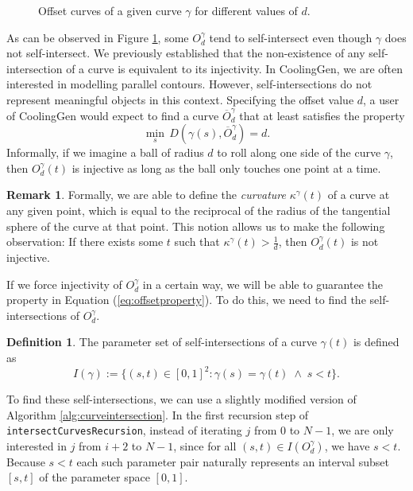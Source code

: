 \documentclass[a4paper, 11pt]{report}
\theoremstyle{definition}
\newtheorem{definition}{Definition}[section]
\newtheorem*{remark}{Remark}
\renewcommand{\emph}[1]{\textit{#1}}
\begin{document}
	\begin{figure}[H]
		\centering
		
		\caption{Offset curves of a given curve $\gamma$ for different values of $d$.}
		\label{fig:offsetcurveexample}
	\end{figure}

	As can be observed in Figure \ref{fig:offsetcurveexample}, some $O^\gamma_d$ tend to self-intersect even though $\gamma$ does not self-intersect. We previously established that the non-existence of any self-intersection of a curve is equivalent to its injectivity. In CoolingGen, we are often interested in modelling parallel contours. However, self-intersections do not represent meaningful objects in this context. Specifying the offset value $d$, a user of CoolingGen would expect to find a curve $\overline{O}^\gamma_d$ that at least satisfies the property
	\begin{equation}\label{eq:offsetproperty}
		\min_s \, D(\gamma(s), \overline{O}^\gamma_d) = d.
	\end{equation}
	Informally, if we imagine a ball of radius $d$ to roll along one side of the curve $\gamma$, then $O^\gamma_d(t)$ is injective as long as the ball only touches one point at a time.
	\begin{remark}
		Formally, we are able to define the \emph{curvature} $\kappa^\gamma(t)$ of a curve at any given point, which is equal to the reciprocal of the radius of the tangential sphere of the curve at that point. This notion allows us to make the following observation: If there exists some $t$ such that $\kappa^\gamma(t) > \frac{1}{d}$, then $O^\gamma_d(t)$ is not injective.
	\end{remark}

	If we force injectivity of $O^\gamma_d$ in a certain way, we will be able to guarantee the property in Equation (\ref{eq:offsetproperty}). To do this, we need to find the self-intersections of $O^\gamma_d$.

	\begin{definition}
		The parameter set of self-intersections of a curve $\gamma(t)$ is defined as
			$$ I(\gamma) := \{(s,t) \in [0,1]^2 : \gamma(s) = \gamma(t) \;\wedge\; s < t \}. $$
	\end{definition}

	To find these self-intersections, we can use a slightly modified version of Algorithm \ref{alg:curveintersection}. In the first recursion step of \texttt{intersectCurvesRecursion}, instead of iterating $j$ from $0$ to $N-1$, we are only interested in $j$ from $i+2$ to $N-1$, since for all $(s,t) \in I(O^\gamma_d)$, we have $s < t$. Because $s < t$ each such parameter pair naturally represents an interval subset $[s, t]$ of the parameter space $[0, 1]$.
\end{document}
